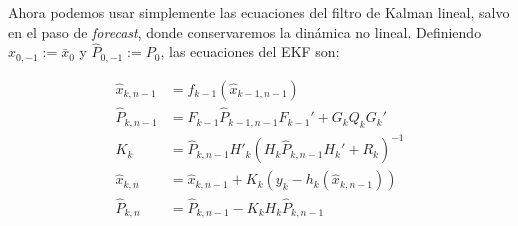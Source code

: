 Ahora podemos usar simplemente las ecuaciones del filtro de Kalman lineal, salvo en el paso de \textit{forecast}, donde conservaremos la dinámica no lineal. Definiendo \(\hat{x}_{0,-1}:= \bar{x}_0\) y \(\hat{P}_{0,-1}:= P_0\), las ecuaciones del EKF son:

\begin{equation}\label{eq:kalman-extended}
\begin{aligned}
\hat{x}_{k,n-1} &= f_{k-1}( \hat{x}_{k-1,n-1}) \\
\hat{P}_{k,n-1} &= F_{k-1} \hat{P}_{k-1,n-1} F_{k-1}' + G_k Q_k G_k'\\
K_k &= \hat{P}_{k,n-1} H'_{k}(H_{k}\hat{P}_{k,n-1}H_{k}' + R_k)^{-1}\\
\hat{x}_{k,n} &= \hat{x}_{k, n-1} + K_k(y_k-h_k(\hat{x}_{k,n-1})) \\
\hat{P}_{k,n} &= \hat{P}_{k,n-1}- K_k H_{k}\hat{P}_{k,n-1} \\
\end{aligned}
\end{equation}












